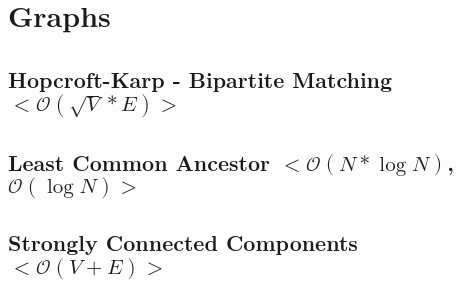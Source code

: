 \documentclass[10pt, a4paper, twoside, notitlepage]{article}
\begin{document}
\begin{titlepage}
\maketitle
\tableofcontents
\alignbottom{\doclicenseThis}
\end{titlepage}


%
%
%
%

\section{Graphs}

\subsection{Hopcroft-Karp - Bipartite Matching $<\mathcal{O}(\sqrt{V}*E)>$}



\newpage

\subsection{Least Common Ancestor $<\mathcal{O}(N*\log N)$, $\mathcal{O}(\log N)>$}



\newpage

\subsection{Strongly Connected Components $<\mathcal{O}(V+E)>$}



\newpage
\end{document}
